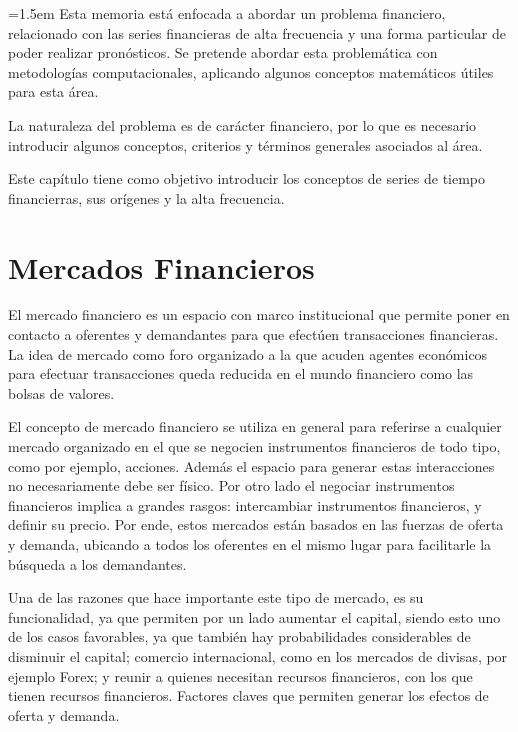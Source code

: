 \parindent=1.5em
Esta memoria está enfocada a abordar un problema financiero, relacionado con las series financieras de alta frecuencia y una forma particular
de poder realizar pronósticos. Se pretende abordar esta problemática con metodologías computacionales, aplicando algunos conceptos matemáticos
útiles para esta área.

La naturaleza del problema es de carácter financiero, por lo que es necesario introducir algunos conceptos, criterios y términos generales
asociados al área.

Este capítulo tiene como objetivo introducir los conceptos de series de tiempo financierras, sus orígenes y la alta frecuencia.

\section{Mercados Financieros}

El mercado financiero es un espacio con marco institucional que permite poner en contacto a oferentes y demandantes para que efectúen
transacciones financieras. La idea de mercado como foro organizado a la que acuden agentes económicos para efectuar transacciones
queda reducida en el mundo financiero como las bolsas de valores.

El concepto de mercado financiero se utiliza en general para referirse a cualquier mercado organizado en el que se negocien instrumentos financieros
de todo tipo, como por ejemplo, acciones. Además el espacio para generar estas interacciones no necesariamente debe ser físico. Por otro lado el negociar
instrumentos financieros implica a grandes rasgos: intercambiar instrumentos financieros, y definir su precio. Por ende, estos mercados están basados en
las fuerzas de oferta y demanda, ubicando a todos los oferentes en el mismo lugar para facilitarle la búsqueda a los demandantes.

Una de las razones que hace importante este tipo de mercado, es su funcionalidad, ya que permiten por un lado aumentar el capital, siendo esto uno 
de los casos favorables, ya que también hay probabilidades considerables de disminuir el capital; comercio internacional, como en los mercados de 
divisas, por ejemplo Forex; y reunir a quienes necesitan recursos financieros, con los que tienen recursos financieros. Factores claves
que permiten generar los efectos de oferta y demanda.

